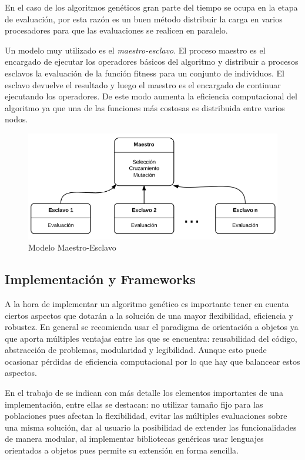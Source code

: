 En el caso de los algoritmos genéticos gran parte del tiempo se ocupa en la etapa de evaluación, por esta razón es un buen método distribuir la carga en varios procesadores para que las evaluaciones se realicen en paralelo. 

Un modelo muy utilizado es el \emph{maestro-esclavo}. El proceso maestro es el encargado de ejecutar los operadores básicos del algoritmo y distribuir a procesos esclavos la evaluación de la función fitness para un conjunto de individuos. El esclavo devuelve el resultado y luego el maestro es el encargado de continuar ejecutando los operadores. De este modo aumenta la eficiencia computacional del algoritmo ya que una de las funciones más costosas es distribuida entre varios nodos.

\begin{figure}[H]
	\centering
	\includegraphics[width=0.9\linewidth]{Figures/diagrama-master-slave}
	\caption[Modelo Maestro-Esclavo]{Modelo Maestro-Esclavo}
	\label{fig:diagrama-master-slave}
\end{figure}

\subsection{Implementación y Frameworks}

A la hora de implementar un algoritmo genético es importante tener en cuenta ciertos aspectos que dotarán a la solución de una mayor flexibilidad, eficiencia y robustez. En general se recomienda usar el paradigma de orientación a objetos ya que aporta múltiples ventajas entre las que se encuentra: reusabilidad del código, abstracción de problemas, modularidad y legibilidad. Aunque esto puede ocasionar pérdidas de eficiencia computacional por lo que hay que balancear estos aspectos.

En el trabajo de \citet{Alba1997} se indican con más detalle los elementos importantes de una implementación, entre ellas se destacan: no utilizar tamaño fijo para las poblaciones pues afectan la flexibilidad, evitar las múltiples evaluaciones sobre una misma solución, dar al usuario la posibilidad de extender las funcionalidades de manera modular, al implementar bibliotecas genéricas usar lenguajes orientados a objetos pues permite su extensión en forma sencilla.

